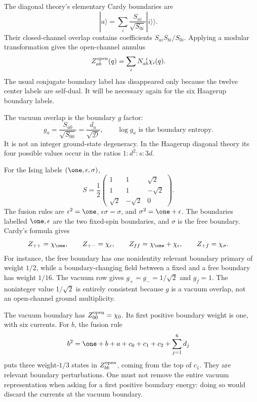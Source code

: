 The diagonal
theory's elementary Cardy boundaries are
\begin{equation}
 |a\rangle=\sum_i\frac{S_{ai}}{\sqrt{S_{0i}}}
                                      |i\rangle\!\rangle.
 \label{eq:defect-Cardy}
\end{equation}
Their closed-channel overlap contains coefficients
$S_{ai}S_{bi}/S_{0i}$. Applying a modular transformation gives
the open-channel annulus
\begin{equation}
 Z_{ab}^{\rm open}(q)=\sum_iN_{ab}^{\ i}\chi_i(q).
 \label{eq:defect-annulus}
\end{equation}
The usual conjugate boundary label has disappeared only because
the twelve center labels are self-dual. It will be necessary
again for the six Haagerup boundary labels.

The vacuum overlap is the boundary $g$ factor:
\begin{equation}
 g_a=\frac{S_{a0}}{\sqrt{S_{00}}}
     =\frac{d_a}{\sqrt{\mathcal D}},
 \qquad \log g_a\text{ is the boundary entropy}.
 \label{eq:defect-g}
\end{equation}
It is not an integer ground-state degeneracy. In the Haagerup
diagonal theory its four possible values occur in the ratios
$1:d^2:s:3d$.

\begin{example}
\label{ex:defect-Ising-boundaries}
For the Ising labels $(\one,\epsilon,\sigma)$,
\[
 S=\frac12
 \begin{pmatrix}
 1&1&\sqrt2\\
 1&1&-\sqrt2\\
 \sqrt2&-\sqrt2&0
 \end{pmatrix}.
\]
The fusion rules are
$\epsilon^2=\one$, $\epsilon\sigma=\sigma$,
and $\sigma^2=\one+\epsilon$. The boundaries labelled
$\one,\epsilon$ are the two fixed-spin boundaries, and
$\sigma$ is the free boundary. Cardy's formula gives
\[
 Z_{++}=\chi_{\one},\qquad
 Z_{+-}=\chi_\epsilon,\qquad
 Z_{ff}=\chi_{\one}+\chi_\epsilon,\qquad
 Z_{+f}=\chi_\sigma.
\]
For instance, the free boundary has one nonidentity relevant boundary
primary of weight $1/2$, while a boundary-changing field
between a fixed and a free boundary has weight $1/16$.
The vacuum row gives
$g_+=g_-=1/\sqrt2$ and $g_f=1$. The noninteger value
$1/\sqrt2$ is entirely consistent because $g$ is a vacuum
overlap, not an open-channel ground multiplicity.
\end{example}

\begin{example}
The vacuum boundary has $Z_{00}^{\rm open}=\chi_0$. Its first
positive boundary weight is one, with six currents.
For $b$, the fusion rule
\[
 b^2=\one+b+a+c_0+c_1+c_2+\sum_{j=1}^6d_j
\]
puts three weight-$1/3$ states in $Z_{bb}^{\rm open}$, coming
from the top of $c_1$. They are relevant boundary perturbations.
One must not remove the entire vacuum representation when asking
for a first positive boundary energy: doing so would discard the
currents at the vacuum boundary.
\end{example}

